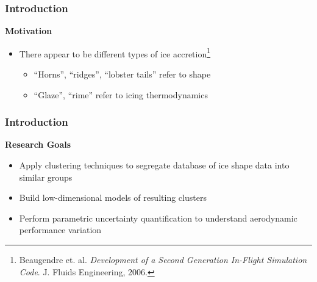 \documentclass[9pt]{beamer}
\begin{document}
\begin{frame}
\frametitle{Introduction}
\label{sec-1-3}

\textbf{Motivation}
\begin{itemize}
\item There appear to be different types of ice accretion\footnote{Beaugendre et. al. \emph{Development of a Second Generation In-Flight Simulation Code}. J. Fluids Engineering, 2006.
 }
\begin{itemize}
\item ``Horns'', ``ridges'', ``lobster tails'' refer to shape
\item ``Glaze'', ``rime'' refer to icing thermodynamics
\end{itemize}
\end{itemize}

\vspace*{-0.0cm}\begin{figure}
 
\end{figure}
\end{frame}
\begin{frame}
\frametitle{Introduction}
\label{sec-1-4}

\textbf{Research Goals}
\begin{itemize}
\item Apply clustering techniques to segregate database of ice shape data
  into similar groups
\item Build low-dimensional models of resulting clusters
\item Perform parametric uncertainty quantification to understand
  aerodynamic performance variation
\end{itemize}
\end{frame}
\end{document}
